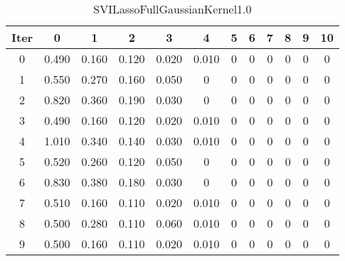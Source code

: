 \begin{table}
	\begin{center}
		\begin{tabular}{|c|c|c|c|c|c|c|c|c|c|c|c|}
			\hline
			Iter & 0 & 1 & 2 & 3 & 4 & 5 & 6 & 7 & 8 & 9 & 10 \\
			\hline
			0 & 0.490 & 0.160 & 0.120 & 0.020 & 0.010 & 0 & 0 & 0 & 0 & 0 & 0 \\
			\hline
			1 & 0.550 & 0.270 & 0.160 & 0.050 & 0 & 0 & 0 & 0 & 0 & 0 & 0 \\
			\hline
			2 & 0.820 & 0.360 & 0.190 & 0.030 & 0 & 0 & 0 & 0 & 0 & 0 & 0 \\
			\hline
			3 & 0.490 & 0.160 & 0.120 & 0.020 & 0.010 & 0 & 0 & 0 & 0 & 0 & 0 \\
			\hline
			4 & 1.010 & 0.340 & 0.140 & 0.030 & 0.010 & 0 & 0 & 0 & 0 & 0 & 0 \\
			\hline
			5 & 0.520 & 0.260 & 0.120 & 0.050 & 0 & 0 & 0 & 0 & 0 & 0 & 0 \\
			\hline
			6 & 0.830 & 0.380 & 0.180 & 0.030 & 0 & 0 & 0 & 0 & 0 & 0 & 0 \\
			\hline
			7 & 0.510 & 0.160 & 0.110 & 0.020 & 0.010 & 0 & 0 & 0 & 0 & 0 & 0 \\
			\hline
			8 & 0.500 & 0.280 & 0.110 & 0.060 & 0.010 & 0 & 0 & 0 & 0 & 0 & 0 \\
			\hline
			9 & 0.500 & 0.160 & 0.110 & 0.020 & 0.010 & 0 & 0 & 0 & 0 & 0 & 0 \\
			\hline
		\end{tabular}
	\end{center}
	\caption{SVILassoFullGaussianKernel1.0}
\end{table}